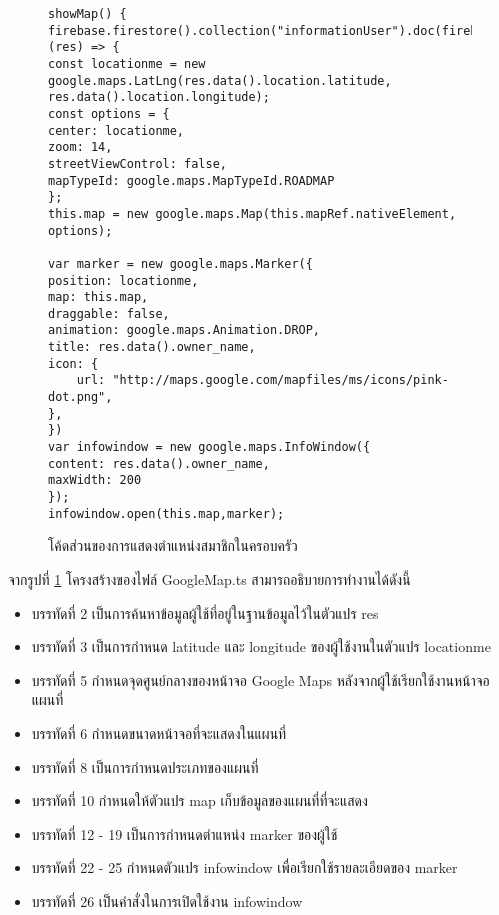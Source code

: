 \begin{figure}[H]
{\lstset{language=Pascal}
\begin{lstlisting}
showMap() {
firebase.firestore().collection("informationUser").doc(firebase.auth().currentUser.uid).get().then( (res) => {
const locationme = new google.maps.LatLng(res.data().location.latitude, res.data().location.longitude);
const options = {
center: locationme,
zoom: 14,
streetViewControl: false,
mapTypeId: google.maps.MapTypeId.ROADMAP
};
this.map = new google.maps.Map(this.mapRef.nativeElement, options);

var marker = new google.maps.Marker({
position: locationme,
map: this.map,
draggable: false,
animation: google.maps.Animation.DROP,
title: res.data().owner_name,
icon: {
	url: "http://maps.google.com/mapfiles/ms/icons/pink-dot.png",
},
})
var infowindow = new google.maps.InfoWindow({
content: res.data().owner_name,
maxWidth: 200
});
infowindow.open(this.map,marker);
\end{lstlisting}}
\caption{โค้ดส่วนของการแสดงตำแหน่งสมาชิกในครอบครัว}
\label{Fig:4-googlemap}
\end{figure}
\newpage

จากรูปที่ \ref{Fig:4-googlemap} โครงสร้างของไฟล์ GoogleMap.ts สามารถอธิบายการทำงานได้ดังนี้
\begin{itemize}[label={--}]
\item บรรทัดที่ 2 เป็นการค้นหาข้อมูลผู้ใช้ที่อยู่ในฐานข้อมูลไว้ในตัวแปร res
\item บรรทัดที่ 3 เป็นการกำหนด latitude และ longitude ของผู้ใช้งานในตัวแปร locationme
\item บรรทัดที่ 5 กำหนดจุดศูนย์กลางของหน้าจอ Google Maps หลังจากผู้ใช้เรียกใช้งานหน้าจอแผนที่
\item บรรทัดที่ 6 กำหนดขนาดหน้าจอที่จะแสดงในแผนที่
\item บรรทัดที่ 8 เป็นการกำหนดประเภทของแผนที่
\item บรรทัดที่ 10 กำหนดให้ตัวแปร map เก็บข้อมูลของแผนที่ที่จะแสดง
\item บรรทัดที่ 12 - 19 เป็นการกำหนดตำแหน่ง marker ของผู้ใช้
\item บรรทัดที่ 22 - 25 กำหนดตัวแปร infowindow เพื่อเรียกใช้รายละเอียดของ marker
\item บรรทัดที่ 26 เป็นคำสั่งในการเปิดใช้งาน infowindow
\end{itemize}
\newpage



